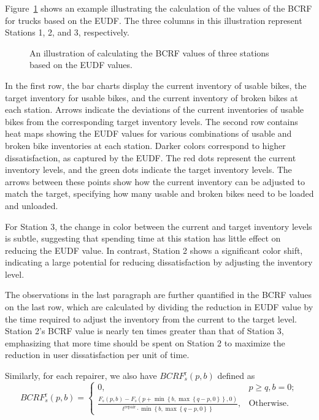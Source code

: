 Figure~\ref{ch4:fig:bcrf-eudf} shows an example illustrating the calculation of the values of the BCRF for trucks based on
the EUDF. The three columns in this illustration represent Stations 1, 2, and 3, respectively.

\begin{figure}[htbp]
\centering
{}
\caption{An illustration of calculating the BCRF values of three stations based on the EUDF values.}
\label{ch4:fig:bcrf-eudf}
\end{figure}

In the first row, the bar charts display the current inventory of usable bikes, the target inventory
for usable bikes, and the current inventory of broken bikes at each station. Arrows indicate the
deviations of the current inventories of usable bikes from the corresponding target inventory
levels. The second row contains heat maps showing the EUDF values for various combinations of usable
and broken bike inventories at each station. Darker colors correspond to higher dissatisfaction, as
captured by the EUDF. The red dots represent the current inventory levels, and the green dots
indicate the target inventory levels. The arrows between these points show how the current inventory
can be adjusted to match the target, specifying how many usable and broken bikes need to be loaded
and unloaded.

For Station 3, the change in color between the current and target inventory levels is subtle,
suggesting that spending time at this station has little effect on reducing the EUDF value. In
contrast, Station 2 shows a significant color shift, indicating a large potential for reducing
dissatisfaction by adjusting the inventory level.

The observations in the last paragraph are further quantified in the BCRF values on the last row,
which are calculated by dividing the reduction in EUDF value by the time required to adjust the
inventory from the current to the target level. Station 2's BCRF value is nearly ten times greater
than that of Station 3, emphasizing that more time should be spent on Station 2 to maximize the
reduction in user dissatisfaction per unit of time.

Similarly, for each repairer, we also have \(\mathit{BCR}F_{s}^{\text{r}}\left( {p,b} \right)\)
defined as\begin{equation}
\label{ch4:eq:69}
\mathit{BCR}F_{s}^{\text{r}}\left( {p,b} \right) = \left\{ \begin{array}{lc}
{0,} & {p \geq q,b = 0;} \\
{\frac{F_{s}\left( {p,b} \right) - F_{s}\left( {p + \min\left\{ {b,\max\left\{ {q - p,0} \right\}} \right\},0} \right)}{t^{\text{repair}} \cdot \min\left\{ {b,\max\left\{ {q - p,0} \right\}} \right\}},} & {\text{Otherwise}\text{.}}
\end{array} \right.
\end{equation}

